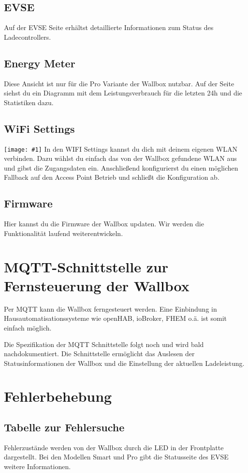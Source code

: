 \documentclass[a4paper,10pt]{article}
\newcommand{\gfx}[1]{\texttt{[image: \#1]}}
\begin{document}
\begin{multicols*}{2}
	\subsection{EVSE}
	Auf der EVSE Seite erhältst detaillierte Informationen zum Status des
	Ladecontrollers.

	\subsection{Energy Meter}
	Diese Ansicht ist nur für die Pro Variante der Wallbox nutzbar. Auf der Seite
	siehst du ein Diagramm mit dem Leistungsverbrauch für die letzten 24h und die
	Statistiken dazu.

	\subsection{WiFi Settings}
	\gfx{./img/resized/web_wifi}
	In den WIFI Settings kannst du dich mit deinem eigenen WLAN verbinden. Dazu
	wählst du einfach das von der Wallbox gefundene WLAN aus und gibst die
	Zugangsdaten ein. Anschließend konfigurierst du einen möglichen Fallback auf
	den Access Point Betrieb und schließt die Konfiguration ab.

	\subsection{Firmware}
	Hier kannst du die Firmware der Wallbox updaten. Wir werden die Funktionalität
	laufend weiterentwickeln.

	\section{MQTT-Schnittstelle zur Fernsteuerung der Wallbox}
	Per MQTT kann die Wallbox ferngesteuert werden. Eine Einbindung in
	Hausautomatisationssysteme wie openHAB, ioBroker, FHEM o.ä. ist somit einfach
	möglich.

	Die Spezifikation der MQTT Schnittstelle folgt noch und wird bald
	nachdokumentiert. Die Schnittstelle ermöglicht das Auslesen der
	Statusinformationen der Wallbox und die Einstellung der aktuellen Ladeleistung.
	\newpage \section{Fehlerbehebung}\label{fehlerbehebung} \subsection{Tabelle zur Fehlersuche}
	Fehlerzustände werden von der Wallbox durch die LED in der Frontplatte
	dargestellt. Bei den Modellen Smart und Pro gibt die Statusseite des EVSE
	weitere Informationen.


\end{multicols*}
\end{document}

